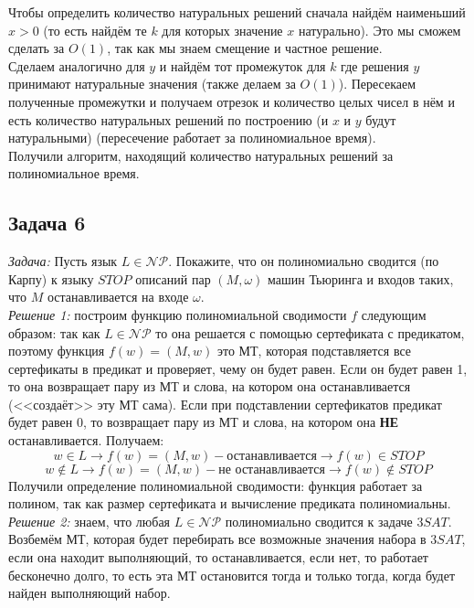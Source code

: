 \documentclass[a4paper,12pt]{article} %
\begin{document}
Чтобы определить количество натуральных решений сначала найдём наименьший $ x > 0 $ (то есть найдём те $ k $ для которых значение $ x $ натурально). Это мы сможем сделать за $ O(1) $, так как мы знаем смещение и частное решение.\\

Сделаем аналогично для $ y $ и найдём тот промежуток для $ k $ где решения $ y $ принимают натуральные значения (также делаем за $ O(1) $). Пересекаем полученные промежутки и получаем отрезок и количество целых чисел в нём и есть количество натуральных решений по построению (и $ x $ и $ y $ будут натуральными) (пересечение работает за полиномиальное время).\\ Получили алгоритм, находящий количество натуральных решений за полиномиальное время. 




\subsection*{Задача 6}
\textit{Задача:} Пусть язык $L\in\mathcal{NP}$. Покажите, что он полиномиально сводится (по Карпу) к языку $STOP$ описаний пар $(M, \omega)$ машин Тьюринга и входов таких, что $M$ останавливается на входе $\omega$. \\

\textit{Решение 1:} построим функцию полиномиальной сводимости $ f $ следующим образом: так как $L\in\mathcal{NP}$ то она решается с помощью сертефиката с предикатом, поэтому функция $ f(w) = (M,w) $ это МТ, которая подставляется все сертефикаты в предикат и проверяет, чему он будет равен. Если он будет равен 1, то она возвращает пару из МТ и слова, на котором она останавливается (<<создаёт>> эту МТ сама). Если при подставлении сертефикатов предикат будет равен 0, то возвращает пару  из МТ и слова, на котором она \textbf{НЕ} останавливается. Получаем:\\
$$
w \in L \rightarrow f(w) = (M,w) - \text{останавливается} \rightarrow f(w) \in STOP
$$
$$
w \notin L \rightarrow f(w) = (M,w) - \text{не останавливается} \rightarrow f(w) \notin STOP
$$
Получили определение полиномиальной сводимости: функция работает за полином, так как размер сертефиката и вычисление предиката полиномиальны.\\

\textit{Решение 2:} знаем, что любая $L\in\mathcal{NP}$ полиномиально сводится к задаче $ 3SAT $. Возбемём МТ, которая будет перебирать все возможные значения набора в $ 3SAT $, если она находит выполняющий, то останавливается, если нет, то работает бесконечно долго, то есть эта МТ остановится тогда и только тогда, когда будет найден выполняющий набор.\\
\end{document}
